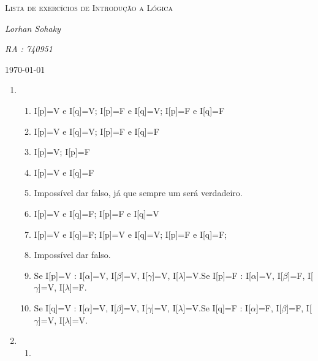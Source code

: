 \documentclass[12pt]{article}
\begin{document}
	\begin{titlepage}
		\centering
			{\scshape\LARGE Lista de exercícios de Introdução a Lógica \par}
		\vspace{4cm}
			{\Large\itshape Lorhan Sohaky\par}
		\vspace{0.3cm}
			{\scshape\itshape RA : 740951\par}
		\vfill
	{\large \today\par}
	\end{titlepage}
	
	\begin{enumerate}
	  \item \begin{enumerate}
	    		\item I[p]=V e I[q]=V; I[p]=F e I[q]=V; I[p]=F e I[q]=F
	    		\item I[p]=V e I[q]=V; I[p]=F e I[q]=F
	    		\item I[p]=V; I[p]=F
	    		\item I[p]=V e I[q]=F
	    		\item Impossível dar falso, já que sempre um será verdadeiro.
	    		\item I[p]=V e I[q]=F; I[p]=F e I[q]=V
	    		\item I[p]=V e I[q]=F; I[p]=V e I[q]=V; I[p]=F e I[q]=F;
	    		\item Impossível dar falso.
	    		\item Se I[p]=V : I[$\alpha$]=V, I[$\beta$]=V, I[$\gamma$]=V,
	    		I[$\lambda$]=V.\newline Se I[p]=F : I[$\alpha$]=V, I[$\beta$]=F,
	    		I[$\gamma$]=V, I[$\lambda$]=F.
	    		
	    		\item Se I[q]=V : I[$\alpha$]=V, I[$\beta$]=V, I[$\gamma$]=V,
	    		I[$\lambda$]=V.\newline Se I[q]=F : I[$\alpha$]=F, I[$\beta$]=F,
	    		I[$\gamma$]=V, I[$\lambda$]=V.
	  		\end{enumerate}
	  \item \begin{enumerate}
	    \item 
	  \end{enumerate}
	\end{enumerate}
\end{document}
